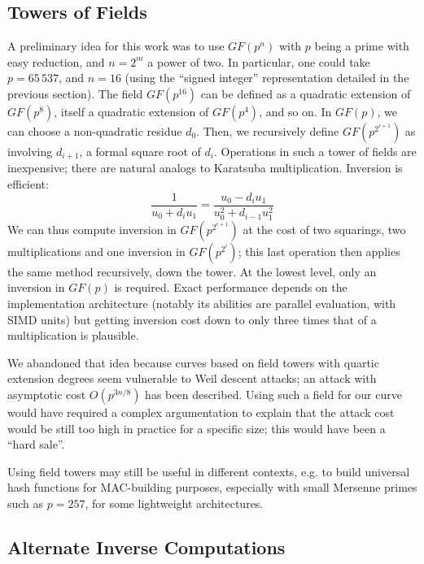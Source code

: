 \documentclass{llncs}
\newcommand{\GF}{GF}
\begin{document}
\subsection{Towers of Fields}\label{sec:unused-towers}

A preliminary idea for this work was to use $\GF(p^n)$ with $p$ being a
prime with easy reduction, and $n = 2^m$ a power of two. In particular,
one could take $p = 65\,537$, and $n = 16$ (using the ``signed integer''
representation detailed in the previous section). The field $\GF(p^{16})$
can be defined as a quadratic extension of $\GF(p^8)$, itself a quadratic
extension of $\GF(p^4)$, and so on. In $\GF(p)$, we can choose a
non-quadratic residue $d_0$. Then, we recursively define $\GF(p^{2^{i+1}})$
as involving $d_{i+1}$, a formal square root of $d_{i}$. Operations in
such a tower of fields are inexpensive; there are natural analogs to
Karatsuba multiplication. Inversion is efficient:
\begin{equation*}
    \frac{1}{u_0 + d_i u_1} = \frac{u_0 - d_i u_1}{u_0^2 + d_{i-1}u_1^2}
\end{equation*}
We can thus compute inversion in $\GF(p^{2^{i+1}})$ at the cost of two
squarings, two multiplications and one inversion in $\GF(p^{2^i})$; this
last operation then applies the same method recursively, down the tower.
At the lowest level, only an inversion in $\GF(p)$ is required. Exact
performance depends on the implementation architecture (notably its
abilities are parallel evaluation, with SIMD units) but getting
inversion cost down to only three times that of a multiplication is
plausible.

We abandoned that idea because curves based on field towers with quartic
extension degrees seem vulnerable to Weil descent attacks; an attack
with asymptotic cost $O(p^{3n/8})$ has been described\cite{Gau2009}.
Using such a field for our curve would have required a complex
argumentation to explain that the attack cost would be still too high in
practice for a specific size; this would have been a ``hard sale''.

Using field towers may still be useful in different contexts, e.g. to
build universal hash functions for MAC-building purposes, especially
with small Mersenne primes such as $p = 257$, for some lightweight
architectures.

\subsection{Alternate Inverse Computations}\label{sec:unused-inverse}
\end{document}
